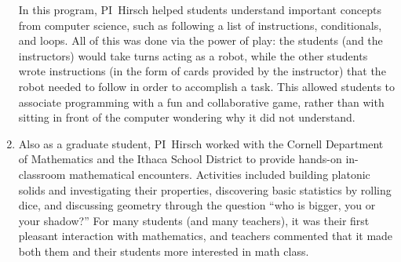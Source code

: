 \begin{enumerate}
  In this program, PI~Hirsch helped students understand important concepts from computer science, such as following a list of instructions, conditionals, and loops.
  All of this was done via the power of play: the students (and the instructors) would take turns acting as a robot, while the other students wrote instructions (in the form of cards provided by the instructor) that the robot needed to follow in order to accomplish a task.
  This allowed students to associate programming with a fun and collaborative game, rather than with sitting in front of the computer wondering why it did not understand.
\item Also as a graduate student, PI~Hirsch worked with the Cornell Department of Mathematics and the Ithaca School District to provide hands-on in-classroom mathematical encounters.
  Activities included building platonic solids and investigating their properties, discovering basic statistics by rolling dice, and discussing geometry through the question ``who is bigger, you or your shadow?''
  For many students (and many teachers), it was their first pleasant interaction with mathematics, and teachers commented that it made both them and their students more interested in math class.
\end{enumerate}



